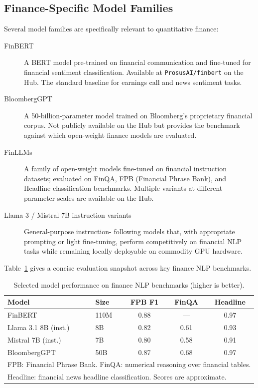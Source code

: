 \subsection{Finance-Specific Model Families}
\label{app:hf:finance-models}

Several model families are specifically relevant to quantitative finance:

\begin{description}
  \item[FinBERT \citep{araci2019finbert}] A BERT model pre-trained on
        financial communication and fine-tuned for financial sentiment
        classification.  Available at
        \texttt{ProsusAI/finbert} on the Hub.  The standard baseline for
        earnings call and news sentiment tasks.

  \item[BloombergGPT \citep{wu2023bloomberggpt}] A 50-billion-parameter model
        trained on Bloomberg's proprietary financial corpus.  Not publicly
        available on the Hub but provides the benchmark against which
        open-weight finance models are evaluated.

  \item[FinLLMs] A family of open-weight models fine-tuned on financial
        instruction datasets; evaluated on FinQA, FPB (Financial Phrase Bank),
        and Headline classification benchmarks.  Multiple variants at different
        parameter scales are available on the Hub.

  \item[Llama 3 / Mistral 7B instruction variants] General-purpose instruction-
        following models that, with appropriate prompting or light fine-tuning,
        perform competitively on financial NLP tasks while remaining locally
        deployable on commodity GPU hardware.
\end{description}

Table~\ref{tab:finance-models} gives a concise evaluation snapshot across
key finance NLP benchmarks.

\begin{table}[ht]
\centering
\caption{Selected model performance on finance NLP benchmarks (higher is better).}
\label{tab:finance-models}
\begin{tabular}{llccc}
\toprule
\textbf{Model} & \textbf{Size} & \textbf{FPB F1} & \textbf{FinQA} & \textbf{Headline} \\
\midrule
FinBERT             & 110M  & 0.88 & ---  & 0.97 \\
Llama 3.1 8B (inst.)& 8B    & 0.82 & 0.61 & 0.93 \\
Mistral 7B (inst.)  & 7B    & 0.80 & 0.58 & 0.91 \\
BloombergGPT        & 50B   & 0.87 & 0.68 & 0.97 \\
\bottomrule
\multicolumn{5}{l}{\footnotesize FPB: Financial Phrase Bank. FinQA: numerical reasoning over financial tables.} \\
\multicolumn{5}{l}{\footnotesize Headline: financial news headline classification. Scores are approximate.}
\end{tabular}
\end{table}

